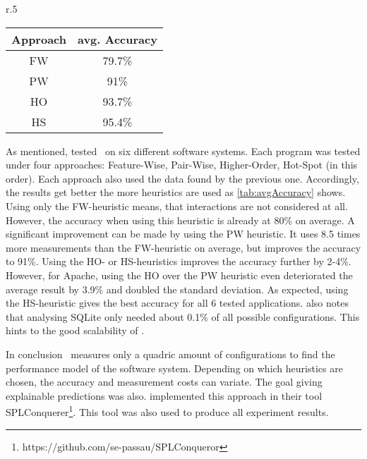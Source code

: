 \begin{wrapfigure}[11]{r}{.5\textwidth}
	\centering
	\vspace{-\baselineskip}
	\label{tab:avgAccuracy}
	\begin{tabular}{c|c}
		Approach&avg. Accuracy\\\midrule[1pt]
		FW&79.7\%\\\hline
		PW&91\%\\\hline
		HO&93.7\%\\\hline
		HS&95.4\%\\\hline
	\end{tabular}
\end{wrapfigure}

As mentioned, \citet{AutomatedFeatureDetectionSiegmund2012} tested \AFID~on six different software systems. Each program was tested under four approaches: Feature-Wise, Pair-Wise, Higher-Order, Hot-Spot (in this order). Each approach also used the data found by the previous one. Accordingly, the results get better the more heuristics are used as \cref{tab:avgAccuracy} shows. Using only the FW-heuristic means, that interactions are not considered at all. However, the accuracy when using this heuristic is already at 80\% on average. A significant improvement can be made by using the PW heuristic. It uses  8.5 times more measurements than the FW-heuristic on average, but improves the accuracy to 91\%. Using the HO- or HS-heuristics improves the accuracy further by 2-4\%. However, for Apache, using the HO over the PW heuristic even deteriorated the average result by 3.9\% and doubled the standard deviation. As expected, using the HS-heuristic gives the best accuracy for all 6 tested applications. \citet{AutomatedFeatureDetectionSiegmund2012} also notes that analysing SQLite only needed about 0.1\% of all possible configurations. This hints to the good scalability of \AFID.

In conclusion \AFID~measures only a quadric amount of configurations to find the performance model of the software system. Depending on which heuristics are chosen, the accuracy and measurement costs can variate. The goal giving explainable predictions was also. \citet{AutomatedFeatureDetectionSiegmund2012} implemented this approach in their tool SPLConquerer\footnote{https://github.com/se-passau/SPLConqueror}. This tool was also used to produce all experiment results.
